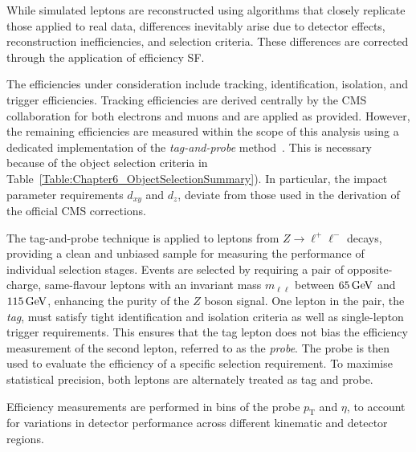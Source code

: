 While simulated leptons are reconstructed using algorithms that closely replicate those applied to real data, differences inevitably arise due to detector effects, reconstruction inefficiencies, and selection criteria. These differences are corrected through the application of efficiency \ac{SF}.

The efficiencies under consideration include tracking, identification, isolation, and trigger efficiencies. Tracking efficiencies are derived centrally by the CMS collaboration for both electrons and muons and are applied as provided. However, the remaining efficiencies are measured within the scope of this analysis using a dedicated implementation of the \textit{tag-and-probe} method~\cite{CMS_Muon_System_Performance,CMS_Muon_System_Performance_2}. This is necessary because of the object selection criteria in Table~\ref{Table:Chapter6_ObjectSelectionSummary}). In particular, the impact parameter requirements $d_{xy}$ and $d_z$, deviate from those used in the derivation of the official CMS corrections. 

The tag-and-probe technique is applied to leptons from $Z \rightarrow \ell^+\ell^-$ decays, providing a clean and unbiased sample for measuring the performance of individual selection stages. Events are selected by requiring a pair of opposite-charge, same-flavour leptons with an invariant mass $m_{\ell\ell}$ between $65\,\text{Ge\hspace{-.08em}V}$ and $115\,\text{Ge\hspace{-.08em}V}$, enhancing the purity of the $Z$ boson signal. One lepton in the pair, the \textit{tag}, must satisfy tight identification and isolation criteria as well as single-lepton trigger requirements. This ensures that the tag lepton does not bias the efficiency measurement of the second lepton, referred to as the \textit{probe}. The probe is then used to evaluate the efficiency of a specific selection requirement. To maximise statistical precision, both leptons are alternately treated as tag and probe. 

Efficiency measurements are performed in bins of the probe $p_{\mathrm{T}}$ and $\eta$, to account for variations in detector performance across different kinematic and detector regions. 

